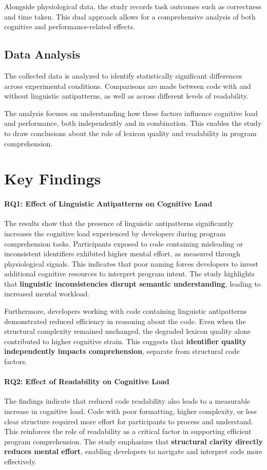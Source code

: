 Alongside physiological data, the study records task outcomes such as correctness and time taken. This dual approach allows for a comprehensive analysis of both cognitive and performance-related effects.

\subsection{Data Analysis}
The collected data is analyzed to identify statistically significant differences across experimental conditions. Comparisons are made between code with and without linguistic antipatterns, as well as across different levels of readability.

The analysis focuses on understanding how these factors influence cognitive load and performance, both independently and in combination. This enables the study to draw conclusions about the role of lexicon quality and readability in program comprehension.

\section{Key Findings}

\paragraph{RQ1: Effect of Linguistic Antipatterns on Cognitive Load}
The results show that the presence of linguistic antipatterns significantly increases the cognitive load experienced by developers during program comprehension tasks. Participants exposed to code containing misleading or inconsistent identifiers exhibited higher mental effort, as measured through physiological signals. This indicates that poor naming forces developers to invest additional cognitive resources to interpret program intent. The study highlights that \textbf{linguistic inconsistencies disrupt semantic understanding}, leading to increased mental workload.

Furthermore, developers working with code containing linguistic antipatterns demonstrated reduced efficiency in reasoning about the code. Even when the structural complexity remained unchanged, the degraded lexicon quality alone contributed to higher cognitive strain. This suggests that \textbf{identifier quality independently impacts comprehension}, separate from structural code factors.

\paragraph{RQ2: Effect of Readability on Cognitive Load}
The findings indicate that reduced code readability also leads to a measurable increase in cognitive load. Code with poor formatting, higher complexity, or less clear structure required more effort for participants to process and understand. This reinforces the role of readability as a critical factor in supporting efficient program comprehension. The study emphasizes that \textbf{structural clarity directly reduces mental effort}, enabling developers to navigate and interpret code more effectively.

